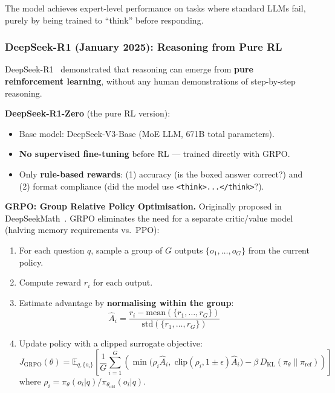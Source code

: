\documentclass[11pt, a4paper]{article}
\theoremstyle{definition}
\theoremstyle{plain}
\newcommand{\E}{\mathbb{E}}
\begin{document}
The model achieves expert-level performance on tasks where standard LLMs fail, purely by being trained to ``think'' before responding.

\subsubsection{DeepSeek-R1 (January 2025): Reasoning from Pure RL}

DeepSeek-R1~\cite{deepseek2025r1} demonstrated that reasoning can emerge from \textbf{pure reinforcement learning}, without any human demonstrations of step-by-step reasoning.

\textbf{DeepSeek-R1-Zero} (the pure RL version):
\begin{itemize}
  \item Base model: DeepSeek-V3-Base (MoE LLM, 671B total parameters).
  \item \textbf{No supervised fine-tuning} before RL --- trained directly with GRPO.
  \item Only \textbf{rule-based rewards}: (1) accuracy (is the boxed answer correct?) and (2) format compliance (did the model use \texttt{<think>...</think>}?).
\end{itemize}

\textbf{GRPO: Group Relative Policy Optimisation.} Originally proposed in DeepSeekMath~\cite{deepseekmath2024}. GRPO eliminates the need for a separate critic/value model (halving memory requirements vs.\ PPO):

\begin{enumerate}
  \item For each question $q$, sample a group of $G$ outputs $\{o_1, \ldots, o_G\}$ from the current policy.
  \item Compute reward $r_i$ for each output.
  \item Estimate advantage by \textbf{normalising within the group}:
  \begin{equation}
    \hat{A}_i = \frac{r_i - \text{mean}(\{r_1, \ldots, r_G\})}{\text{std}(\{r_1, \ldots, r_G\})}
  \end{equation}
  \item Update policy with a clipped surrogate objective:
  \begin{equation}
    J_{\text{GRPO}}(\theta) = \E_{q, \{o_i\}} \left[ \frac{1}{G} \sum_{i=1}^{G} \left( \min\bigl(\rho_i\hat{A}_i,\; \text{clip}(\rho_i, 1{\pm}\epsilon)\hat{A}_i\bigr) - \beta\, D_{\mathrm{KL}}(\pi_\theta \| \pi_{\mathrm{ref}}) \right) \right]
  \end{equation}
  where $\rho_i = \pi_\theta(o_i|q) / \pi_{\theta_{\text{old}}}(o_i|q)$.
\end{enumerate}
\end{document}
